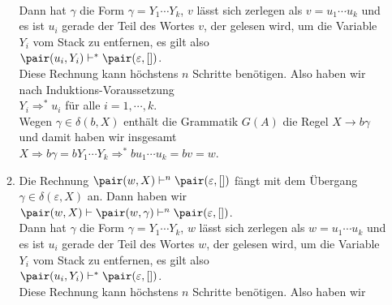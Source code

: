 \begin{enumerate}
\begin{enumerate}
                  \\[0.2cm]
                  Dann hat $\gamma$ die Form $\gamma = Y_1 \cdots Y_k$, $v$ l\"asst sich zerlegen
                  als $v = u_1 \cdots u_k$ und es ist $u_i$ gerade der Teil des Wortes $v$, der
                  gelesen wird, um die Variable $Y_i$ vom Stack zu entfernen, es gilt also
                  \\[0.2cm]
                  \hspace*{1.3cm}
                  $\pair(u_i, Y_i) \vdash^* \pair(\varepsilon, [])$.
                  \\[0.2cm]
                  Diese Rechnung kann h\"ochstens $n$ Schritte ben\"otigen.  Also haben wir
                  nach Induktions-Voraussetzung
                  \\[0.2cm]
                  \hspace*{1.3cm}
                  $Y_i \Rightarrow^* u_i$ \quad f\"ur alle $i = 1, \cdots, k$.
                  \\[0.2cm]
                  Wegen $\gamma \in \delta(b,X)$ enth\"alt die Grammatik $G(A)$ die Regel $X \rightarrow b \gamma$ und
                  damit haben wir insgesamt
                  \\[0.2cm]
                  \hspace*{1.3cm}
                  $X \Rightarrow b \gamma = bY_1 \cdots Y_k \Rightarrow^* b u_1 \cdots u_k = bv = w$.
            \item Die Rechnung $\pair(w,X) \vdash^n \pair(\varepsilon, [])$
                  f\"angt mit dem \"Ubergang $\gamma \in \delta(\varepsilon,X)$ an. Dann
                  haben wir
                  \\[0.2cm]
                  \hspace*{1.3cm}
                  $\pair(w, X) \vdash \pair(w, \gamma) \vdash^n \pair(\varepsilon, [])$.
                  \\[0.2cm]
                  Dann hat $\gamma$ die Form $\gamma = Y_1 \cdots Y_k$, $w$ l\"asst sich zerlegen
                  als $w = u_1 \cdots u_k$ und es ist $u_i$ gerade der Teil des Wortes $w$, der
                  gelesen wird, um die Variable $Y_i$ vom Stack zu entfernen, es gilt also
                  \\[0.2cm]
                  \hspace*{1.3cm}
                  $\pair(u_i, Y_i) \vdash^* \pair(\varepsilon, [])$.
                  \\[0.2cm]
                  Diese Rechnung kann h\"ochstens $n$ Schritte ben\"otigen.  Also haben wir

\end{enumerate}
\end{enumerate}

